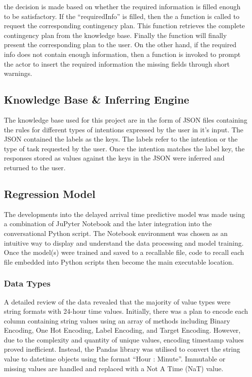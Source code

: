 the decision is made based on whether the required information is filled enough to be satisfactory. If the ``requiredInfo'' is filled, then the a function is called to request the corresponding contingency plan. This function retrieves the complete contingency plan from the knowledge base. Finally the function will finally present the corresponding plan to the user. On the other hand, if the required info does not contain enough information, then a function is invoked to prompt the actor to insert the required information the missing fields through short warnings.

\subsection{Knowledge Base \& Inferring Engine}
 The knowledge base used for this project are in the form of JSON files containing the rules for different types of intentions expressed by the user in it's input. The JSON contained the labels as the keys. The labels refer to the intention or the type of task requested by the user. Once the intention matches the label key, the responses stored as values against the keys in the JSON were inferred and returned to the user. 

\subsection{Regression Model}
The developments into the delayed arrival time predictive model was made using a combination of JuPyter Notebook and the later integration into the conversational Python script. The Notebook environment was chosen as an intuitive way to display and understand the data processing and model training. Once the model(s) were trained and saved to a recallable file, code to recall each file embedded into Python scripts then become the main executable location.

\subsubsection{Data Types}\label{sec: Data Processing}
A detailed review of the data revealed that the majority of value types were string formats with 24-hour time values. Initially, there was a plan to encode each column containing string values using an array of methods including Binary Encoding, One Hot Encoding, Label Encoding, and Target Encoding. However, due to the complexity and quantity of unique values, encoding timestamp values proved inefficient. Instead, the Pandas library was utilised to convert the string value to datetime objects using the format ``Hour : Minute''. Immutable or missing values are handled and replaced with a Not A Time (NaT) value.\vspace{0.5cm}

